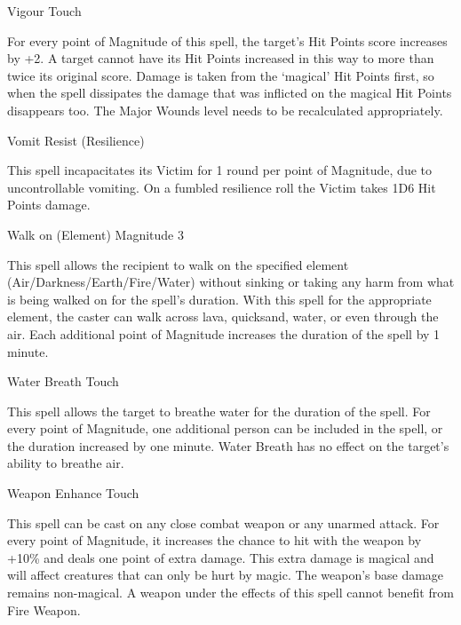 \begin{rpg-spell}
{Vigour}
{Touch}

For every point of Magnitude of this spell, the target’s Hit Points score increases by +2. A target cannot have its Hit Points increased in this way to more than twice its original score. Damage is taken from the ‘magical’ Hit Points first, so when the spell dissipates the damage that was inflicted on the magical Hit Points disappears too. The Major Wounds level needs to be recalculated appropriately.
\end{rpg-spell}


\begin{rpg-spell}
{Vomit}
{Resist (Resilience)}

This spell incapacitates its Victim for 1 round per point of Magnitude, due to uncontrollable vomiting. On a fumbled resilience roll the Victim takes 1D6 Hit Points damage.
\end{rpg-spell}


\begin{rpg-spell}
{Walk on (Element)}
{Magnitude 3}

This spell allows the recipient to walk on the specified element (Air/Darkness/Earth/Fire/Water) without sinking or taking any harm from what is being walked on for the spell’s duration. With this spell for the appropriate element, the caster can walk across lava, quicksand, water, or even through the air. Each additional point of Magnitude increases the duration of the spell by 1 minute.
\end{rpg-spell}


\begin{rpg-spell}
{Water Breath}
{Touch}

This spell allows the target to breathe water for the duration of the spell. For every point of Magnitude, one additional person can be included in the spell, or the duration increased by one minute. Water Breath has no effect on the target’s ability to breathe air.
\end{rpg-spell}


\begin{rpg-spell}
{Weapon Enhance}
{Touch}

This spell can be cast on any close combat weapon or any unarmed attack. For every point of Magnitude, it increases the chance to hit with the weapon by +10\% and deals one point of extra damage. This extra damage is magical and will affect creatures that can only be hurt by magic. The weapon’s base damage remains non-magical. A weapon under the effects of this spell cannot benefit from Fire Weapon.
\end{rpg-spell}


